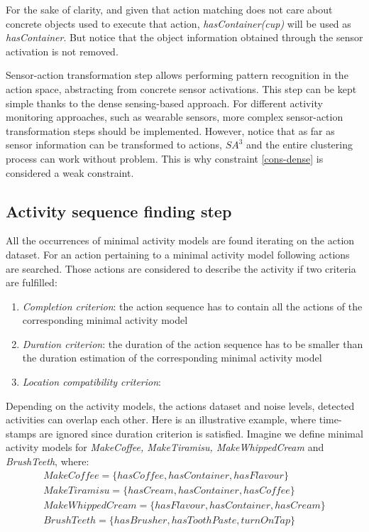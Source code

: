 For the sake of clarity, and given that action matching does not care about concrete objects used to execute that action, \textit{hasContainer(cup)} will be used as \textit{hasContainer}. But notice that the object information obtained through the sensor activation is not removed. 

Sensor-action transformation step allows performing pattern recognition in the action space, abstracting from concrete sensor activations. This step can be kept simple thanks to the dense sensing-based approach. For different activity monitoring approaches, such as wearable sensors, more complex sensor-action transformation steps should be implemented. However, notice that as far as sensor information can be transformed to actions, $SA^3$ and the entire clustering process can work without problem. This is why constraint \ref{cons-dense} is considered a weak constraint.

\subsection{Activity sequence finding step}
\label{subsec:clustering:sa3:find}

All the occurrences of minimal activity models are found iterating on the action dataset. For an action pertaining to a minimal activity model following actions are searched. Those actions are considered to describe the activity if two criteria are fulfilled: 
 \begin{enumerate}
  \item \textit{Completion criterion}: the action sequence has to contain all the actions of the corresponding minimal activity model
  \item \textit{Duration criterion}: the duration of the action sequence has to be smaller than the duration estimation of the corresponding minimal activity model
  \item \textit{Location compatibility criterion}:
 \end{enumerate}
 Depending on the activity models, the actions dataset and noise levels, detected activities can overlap each other. Here is an illustrative example, where time-stamps are ignored since duration criterion is satisfied. Imagine we define minimal activity models for \textit{MakeCoffee, MakeTiramisu, MakeWhippedCream} and \textit{BrushTeeth}, where:
 \begin{equation*}
  \begin{split}
   MakeCoffee =\{hasCoffee, hasContainer, hasFlavour\} \\
  MakeTiramisu = \{hasCream, hasContainer, hasCoffee\} \\
  MakeWhippedCream = \{hasFlavour, hasContainer, hasCream\} \\
  BrushTeeth = \{hasBrusher, hasToothPaste, turnOnTap\} 
  \end{split}
 \end{equation*} 
 
